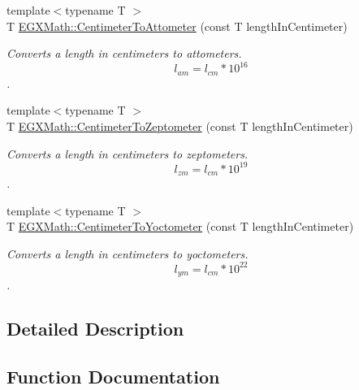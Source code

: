 \begin{DoxyCompactItemize}
{\footnotesize template$<$typename T $>$ }\\T \mbox{\hyperlink{group___e_g_x_math-_conversions-_length_conversions-_centimeter-_s_i_ga72eb99d67c7923a3b17886b47a0fa14d}{E\+G\+X\+Math\+::\+Centimeter\+To\+Attometer}} (const T length\+In\+Centimeter)
\begin{DoxyCompactList}\small\item\em Converts a length in centimeters to attometers. \[ l_{am}=l_{cm} * 10^{16} \]. \end{DoxyCompactList}\item 
{\footnotesize template$<$typename T $>$ }\\T \mbox{\hyperlink{group___e_g_x_math-_conversions-_length_conversions-_centimeter-_s_i_ga1f7a10f9710f514dcc9132d4ce1f0bfa}{E\+G\+X\+Math\+::\+Centimeter\+To\+Zeptometer}} (const T length\+In\+Centimeter)
\begin{DoxyCompactList}\small\item\em Converts a length in centimeters to zeptometers. \[ l_{zm}=l_{cm} * 10^{19} \]. \end{DoxyCompactList}\item 
{\footnotesize template$<$typename T $>$ }\\T \mbox{\hyperlink{group___e_g_x_math-_conversions-_length_conversions-_centimeter-_s_i_ga251be5adc836253a22a995d9f2ce6782}{E\+G\+X\+Math\+::\+Centimeter\+To\+Yoctometer}} (const T length\+In\+Centimeter)
\begin{DoxyCompactList}\small\item\em Converts a length in centimeters to yoctometers. \[ l_{ym}=l_{cm} * 10^{22} \]. \end{DoxyCompactList}\end{DoxyCompactItemize}


\subsection{Detailed Description}


\subsection{Function Documentation}
\mbox{\label{group___e_g_x_math-_conversions-_length_conversions-_centimeter-_s_i_ga72eb99d67c7923a3b17886b47a0fa14d}} 
